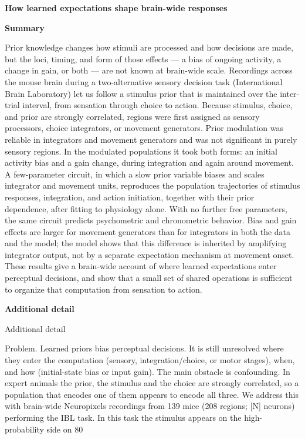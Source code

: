 \documentclass[12pt]{article}
\begin{document}
\begin{center}
\large\bfseries How learned expectations shape brain-wide responses
\end{center}

\vspace{0.4em}
\noindent\textbf{Summary}\par
\vspace{0.15em}
\noindent
Prior knowledge changes how stimuli are processed and how decisions are made, but the loci, timing, and form of those effects --- a bias of ongoing activity, a change in gain, or both --- are not known at brain-wide scale. Recordings across the mouse brain during a two-alternative sensory decision task (International Brain Laboratory) let us follow a stimulus prior that is maintained over the inter-trial interval, from sensation through choice to action. Because stimulus, choice, and prior are strongly correlated, regions were first assigned as sensory processors, choice integrators, or movement generators. Prior modulation was reliable in integrators and movement generators and was not significant in purely sensory regions. In the modulated populations it took both forms: an initial activity bias and a gain change, during integration and again around movement. A few-parameter circuit, in which a slow prior variable biases and scales integrator and movement units, reproduces the population trajectories of stimulus responses, integration, and action initiation, together with their prior dependence, after fitting to physiology alone. With no further free parameters, the same circuit predicts psychometric and chronometric behavior. Bias and gain effects are larger for movement generators than for integrators in both the data and the model; the model shows that this difference is inherited by amplifying integrator output, not by a separate expectation mechanism at movement onset. These results give a brain-wide account of where learned expectations enter perceptual decisions, and show that a small set of shared operations is sufficient to organize that computation from sensation to action.

\vspace{0.55em}
\noindent\textbf{Additional detail}\par
\vspace{0.15em}
\noindent
Additional detail

Problem. Learned priors bias perceptual decisions. It is still unresolved where they enter the computation (sensory, integration/choice, or motor stages), when, and how (initial-state bias or input gain). The main obstacle is confounding. In expert animals the prior, the stimulus and the choice are strongly correlated, so a population that encodes one of them appears to encode all three. We address this with brain-wide Neuropixels recordings from 139 mice (208 regions; [N] neurons) performing the IBL task. In this task the stimulus appears on the high-probability side on 80%
\end{document}

